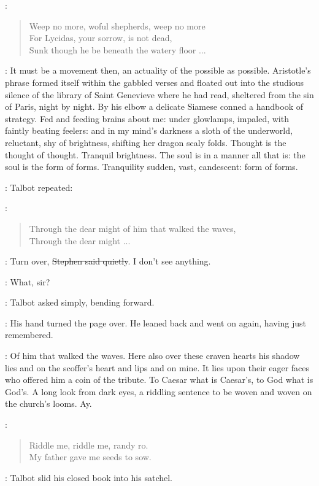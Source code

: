 \talbot:
\begin{verse}
    Weep no more, woful shepherds, weep no more \\
    For Lycidas, your sorrow, is not dead, \\
    Sunk though he be beneath the watery floor ...
\end{verse}

:
It must be a movement then, an actuality of the possible as possible.
Aristotle's phrase formed itself within the gabbled verses
and floated out into the studious silence of the library of Saint Genevieve
where he had read,
sheltered from the sin of Paris,
night by night.
By his elbow a delicate Siamese conned a handbook of strategy.
Fed and feeding brains about me:
under glowlamps, impaled, with faintly beating feelers:
and in my mind's darkness a sloth of the underworld,
reluctant, shy of brightness, shifting her dragon scaly folds.
Thought is the thought of thought.
Tranquil brightness.
The soul is in a manner all that is:
the soul is the form of forms.
Tranquility sudden, vast, candescent: form of forms.

:
Talbot repeated:

\talbot:
\begin{verse}
    Through the dear might of him that walked the waves, \\
    Through the dear might ...
\end{verse}

\Stephen:
Turn over, \sout{Stephen said quietly}.
I don't see anything.

\talbot:
What, sir?

:
Talbot asked simply, bending forward.

:
His hand turned the page over.
He leaned back and went on again, having just remembered.

\StephenInt:
Of him that walked the waves.
Here also over these craven hearts his shadow lies
and on the scoffer's heart and lips and on mine.
It lies upon their eager faces who offered him a coin of the tribute.
To Caesar what is Caesar's, to God what is God's.
A long look from dark eyes,
a riddling sentence to be woven and woven on the church's looms.
Ay.

\StephenInt:
\begin{verse}
    Riddle me, riddle me, randy ro. \\
    My father gave me seeds to sow.
\end{verse}

:
Talbot slid his closed book into his satchel.

